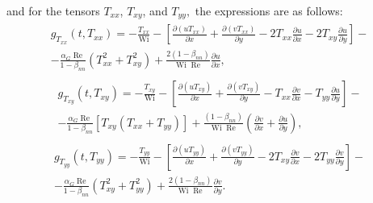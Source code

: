 \documentclass[preprint, 12pt]{elsarticle}
\begin{document}
and for the tensors $T_{xx}$, $T_{xy}$, and $T_{yy},$ the expressions are as follows:
\begin{gather}
    \begin{aligned}
        g_{T_{xx}}\left(t, T_{xx}\right) = - \frac{T_{xx}}{\operatorname{Wi}} - \left[\frac{\partial (uT_{xx})}{\partial x} + \frac{\partial (vT_{xx})}{\partial y} - 2T_{xx}\frac{\partial u}{\partial x} - 2T_{xy}\frac{\partial u}{\partial y}\right] - \\ - \frac{\alpha_{G}\operatorname{Re}}{1-\beta_{nn}}\left(T_{xx}^{2} + T_{xy}^{2}\right) + \frac{2(1-\beta_{nn})}{\operatorname{Wi}\operatorname{Re}}\frac{\partial u}{\partial x},\label{eq_gies_txx_steps_rk}
    \end{aligned}
\end{gather}
\begin{gather}
    \begin{aligned}
        g_{T_{xy}}\left(t, T_{xy}\right) = - \frac{T_{xy}}{\operatorname{Wi}} - \left[\frac{\partial (uT_{xy})} {\partial x} + \frac{\partial (vT_{xy})}{\partial y} - T_{xx}\frac{\partial v}{\partial x} - T_{yy}\frac{\partial u}{\partial y}\right] - \\ - \frac{\alpha_{G}\operatorname{Re}}{1-\beta_{nn}}\left[T_{xy}\left(T_{xx} + T_{yy}\right)\right] + \frac{(1-\beta_{nn})}{\operatorname{Wi}\operatorname{Re}}\left(\frac{\partial v}{\partial x} + \frac{\partial u}{\partial y}\right),\label{eq_gies_txy_steps_rk}
    \end{aligned}
\end{gather}
\begin{gather}
    \begin{aligned}
        g_{T_{yy}}\left(t, T_{yy}\right) =  - \frac{T_{yy}}{\operatorname{Wi}} - \left[\frac{\partial (uT_{yy})}{\partial x} + \frac{\partial (vT_{yy})}{\partial y} - 2T_{xy}\frac{\partial v}{\partial x} - 2T_{yy}\frac{\partial v}{\partial y}\right] - \\ - \frac{\alpha_{G}\operatorname{Re}}{1-\beta_{nn}}\left(T_{xy}^{2} + T_{yy}^{2}\right) + \frac{2(1-\beta_{nn})}{\operatorname{Wi}\operatorname{Re}}\frac{\partial v}{\partial y}.\label{eq_gies_tyy_steps_rk}
    \end{aligned}
\end{gather}
\end{document}
